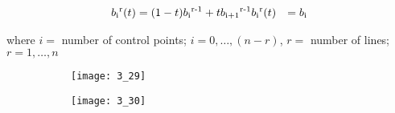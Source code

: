 \documentclass{standalone}
\begin{document}
\begin{itemize}
\begin{itemize}
\begin{itemize}
				\begin{align}
					b\textsubscript{i}\textsuperscript{r}(t) &= (1-t)b\textsubscript{i}\textsuperscript{r-1}+t b\textsubscript{i+1}\textsuperscript{r-1}
					b\textsubscript{i}\textsuperscript{r}(t) &= b\textsubscript{i}
				\end{align}

				where $i =$ number of control points; $i=0,\dots,(n-r)$, $r =$ number of lines; $r=1,\dots,n$
			\end{itemize}
			
			\begin{figure}[H]
				\begin{subfigure}[b]{0.3\textwidth}
					\texttt{[image: 3\_29]} 
				\end{subfigure}
				\begin{subfigure}[b]{0.65\textwidth}
					\texttt{[image: 3\_30]}		
				\end{subfigure}
			\end{figure}
	\end{itemize}
	

\end{itemize}
\end{document}
